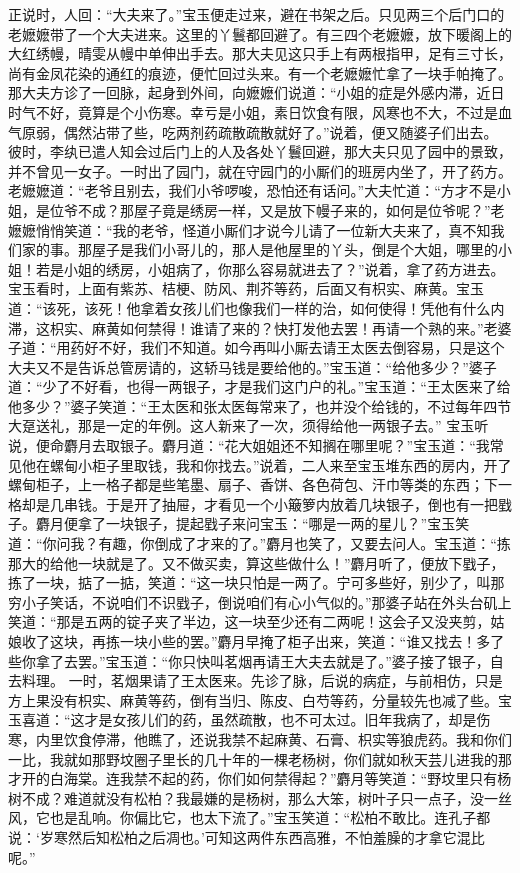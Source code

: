 \documentclass[12pt,oneside]{book}
\begin{document}
正说时，人回：“大夫来了。”宝玉便走过来，避在书架之后。只见两三个后门口的老嬷嬷带了一个大夫进来。这里的丫鬟都回避了。有三四个老嬷嬷，放下暖阁上的大红绣幔，晴雯从幔中单伸出手去。那大夫见这只手上有两根指甲，足有三寸长，尚有金凤花染的通红的痕迹，便忙回过头来。有一个老嬷嬷忙拿了一块手帕掩了。那大夫方诊了一回脉，起身到外间，向嬷嬷们说道：“小姐的症是外感内滞，近日时气不好，竟算是个小伤寒。幸亏是小姐，素日饮食有限，风寒也不大，不过是血气原弱，偶然沾带了些，吃两剂药疏散疏散就好了。”说着，便又随婆子们出去。
彼时，李纨已遣人知会过后门上的人及各处丫鬟回避，那大夫只见了园中的景致，并不曾见一女子。一时出了园门，就在守园门的小厮们的班房内坐了，开了药方。老嬷嬷道：“老爷且别去，我们小爷啰唆，恐怕还有话问。”大夫忙道：“方才不是小姐，是位爷不成？那屋子竟是绣房一样，又是放下幔子来的，如何是位爷呢？”老嬷嬷悄悄笑道：“我的老爷，怪道小厮们才说今儿请了一位新大夫来了，真不知我们家的事。那屋子是我们小哥儿的，那人是他屋里的丫头，倒是个大姐，哪里的小姐！若是小姐的绣房，小姐病了，你那么容易就进去了？”说着，拿了药方进去。
宝玉看时，上面有紫苏、桔梗、防风、荆芥等药，后面又有枳实、麻黄。宝玉道：“该死，该死！他拿着女孩儿们也像我们一样的治，如何使得！凭他有什么内滞，这枳实、麻黄如何禁得！谁请了来的？快打发他去罢！再请一个熟的来。”老婆子道：“用药好不好，我们不知道。如今再叫小厮去请王太医去倒容易，只是这个大夫又不是告诉总管房请的，这轿马钱是要给他的。”宝玉道：“给他多少？”婆子道：“少了不好看，也得一两银子，才是我们这门户的礼。”宝玉道：“王太医来了给他多少？”婆子笑道：“王太医和张太医每常来了，也并没个给钱的，不过每年四节大趸送礼，那是一定的年例。这人新来了一次，须得给他一两银子去。”
宝玉听说，便命麝月去取银子。麝月道：“花大姐姐还不知搁在哪里呢？”宝玉道：“我常见他在螺甸小柜子里取钱，我和你找去。”说着，二人来至宝玉堆东西的房内，开了螺甸柜子，上一格子都是些笔墨、扇子、香饼、各色荷包、汗巾等类的东西；下一格却是几串钱。于是开了抽屉，才看见一个小簸箩内放着几块银子，倒也有一把戥子。麝月便拿了一块银子，提起戥子来问宝玉：“哪是一两的星儿？”宝玉笑道：“你问我？有趣，你倒成了才来的了。”麝月也笑了，又要去问人。宝玉道：“拣那大的给他一块就是了。又不做买卖，算这些做什么！”麝月听了，便放下戥子，拣了一块，掂了一掂，笑道：“这一块只怕是一两了。宁可多些好，别少了，叫那穷小子笑话，不说咱们不识戥子，倒说咱们有心小气似的。”那婆子站在外头台矶上笑道：“那是五两的锭子夹了半边，这一块至少还有二两呢！这会子又没夹剪，姑娘收了这块，再拣一块小些的罢。”麝月早掩了柜子出来，笑道：“谁又找去！多了些你拿了去罢。”宝玉道：“你只快叫茗烟再请王大夫去就是了。”婆子接了银子，自去料理。
一时，茗烟果请了王太医来。先诊了脉，后说的病症，与前相仿，只是方上果没有枳实、麻黄等药，倒有当归、陈皮、白芍等药，分量较先也减了些。宝玉喜道：“这才是女孩儿们的药，虽然疏散，也不可太过。旧年我病了，却是伤寒，内里饮食停滞，他瞧了，还说我禁不起麻黄、石膏、枳实等狼虎药。我和你们一比，我就如那野坟圈子里长的几十年的一棵老杨树，你们就如秋天芸儿进我的那才开的白海棠。连我禁不起的药，你们如何禁得起？”麝月等笑道：“野坟里只有杨树不成？难道就没有松柏？我最嫌的是杨树，那么大笨，树叶子只一点子，没一丝风，它也是乱响。你偏比它，也太下流了。”宝玉笑道：“松柏不敢比。连孔子都说：‘岁寒然后知松柏之后凋也。’可知这两件东西高雅，不怕羞臊的才拿它混比呢。”
\end{document}
